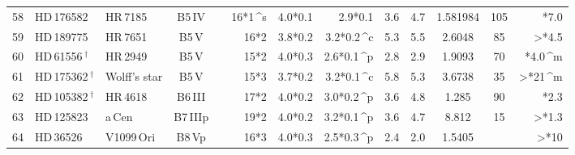 \begin{longtable}{l l l c c D{*}{\,\pm\,}{4,4} D{*}{\,\pm\,}{4,4} D{*}{\,\pm\,}{6,6} c c c c D{*}{\,}{2,4} }
58 & HD\,176582 & HR\,7185 & B5\,IV &  &16*1\,^{s} & 4.0*0.1 & 2.9*0.1 & 3.6 & 4.7 & 1.581984 & 105 & *7.0 \\ 

59 & HD\,189775 & HR\,7651  & B5\,V &  &16*2 & 3.8*0.2 & 3.2*0.2\,^{c} & 5.3 & 5.5 & 2.6048 & 85 & >*4.5 \\ 

60 & HD\,61556\,$^\dagger$ & HR\,2949 & B5\,V &  &15*2 & 4.0*0.3 & 2.6*0.1\,^{p} & 2.8 & 2.9 & 1.9093 & 70 & *4.0\,^m \\ 

61 & HD\,175362\,$^\dagger$ & Wolff's star & B5\,V &  &15*3 & 3.7*0.2 & 3.2*0.1\,^{c} & 5.8 & 5.3 & 3.6738 & 35 & >*21\,^m \\ 

62 & HD\,105382\,$^\dagger$ & HR\,4618 & B6\,III &  &17*2 & 4.0*0.2 & 3.0*0.2\,^{p} & 3.6 & 4.8 & 1.285 & 90 & *2.3 \\ 

63 & HD\,125823 & a\,Cen & B7\,IIIp &  &19*2 & 4.0*0.2 & 3.2*0.1\,^{p} & 3.6 & 4.7 & 8.812 & 15 & >*1.3 \\ 

64 & HD\,36526 & V1099\,Ori & B8\,Vp &  &16*3 & 4.0*0.3 & 2.5*0.3\,^{p} & 2.4 & 2.0 & 1.5405 &  & >*10 \\ 

\hline
\end{longtable}

